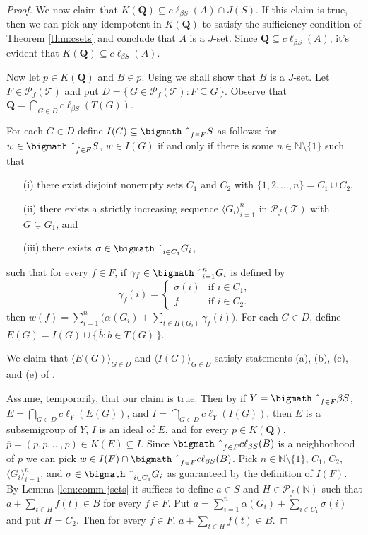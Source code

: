 \documentclass[12pt,showtrims]{memoir}
\theoremstyle{plain}
\theoremstyle{definition}
\newcommand{\la}{\langle}
\newcommand{\ra}{\rangle}
\newcommand{\bbN}{\mathbb{N}}
\newcommand{\calT}{\mathcal{T}}
\newcommand{\Pf}{\mathcal{P}_f}
\newcommand{\bigtimes}{\hbox{\bigmath \char'2}}
\begin{document}
\begin{proof}
  We now claim that $K(\mathbf{Q}) \subseteq c\ell_{\beta S}(A) \cap J(S)$. 
  If this claim is true, then we can pick any idempotent in $K(\mathbf{Q})$ to satisfy the sufficiency condition of Theorem \ref{thm:csets} and conclude that $A$ is a $J$-set.
  Since $\mathbf{Q} \subseteq c\ell_{\beta S}(A)$, it's evident that $K(\mathbf{Q}) \subseteq c\ell_{\beta S}(A)$. 

  Now let $p \in K(\mathbf{Q})$ and $B \in p$.
  Using \cite[Lemma 14.9]{Hindman:1998fk} we shall show that $B$ is a $J$-set.
  Let $F \in \Pf(\calT)$ and put $D = \{\, G \in \Pf(\calT) : F \subseteq G \,\}$. 
  Observe that $\mathbf{Q} = \bigcap_{G \in D} c\ell_{\beta S} (T(G))$.

  For each $G \in D$ define $I(G) \subseteq \bigtimes_{f \in F} S$ as follows: for $w \in \bigtimes_{f \in F} S$, $w \in I(G)$ if and only if there is some $n \in \bbN \setminus \{1\}$ such that
  \begin{itemize}
    \item[(i)]
      there exist disjoint nonempty sets $C_1$ and $C_2$ with $\{1, 2, \ldots, n\} = C_1 \cup C_2$,

    \item[(ii)]
      there exists a strictly increasing sequence $\la G_i \ra_{i=1}^n$ in $\Pf(\calT)$ with $G \subsetneq G_1$, and

    \item[(iii)]
      there exists $\sigma \in \bigtimes_{i \in C_1} G_i$,
  \end{itemize}
  such that for every $f \in F$, if $\gamma_f \in \bigtimes_{i=1}^n G_i$ is defined by
  \[
    \gamma_f(i) =
    \begin{cases}
      \sigma(i) & \mbox{if $i \in C_1$,} \\
      f & \mbox{if $i \in C_2$.}
    \end{cases}
  \]
  then $w(f) = \sum_{i=1}^n\bigl( \alpha(G_i) + \sum_{t \in H(G_i)} \gamma_f(i) \bigr)$.
  For each $G \in D$, define $E(G) = I(G) \cup \{\, \overline{b} : b \in T(G) \,\}$.

  We claim that $\la E(G) \ra_{G \in D}$ and $\la I(G) \ra_{G \in D}$ satisfy statements (a), (b), (c), and (e) of \cite[Lemma 14.9]{Hindman:1998fk}.

  Assume, temporarily, that our claim is true. 
  Then by \cite[Lemma 14.9]{Hindman:1998fk} if $Y = \bigtimes_{f \in F} \beta S$, $E = \bigcap_{G \in D} c\ell_Y(E(G))$, and $I = \bigcap_{G \in D} c\ell_Y(I(G))$, then $E$ is a subsemigroup of $Y$, $I$ is an ideal of $E$, and for every $p \in K(\mathbf{Q})$, $\overline{p} = (p, p, \ldots, p) \in K(E) \subseteq I$. 
  Since $\bigtimes_{f \in F} c\ell_{\beta S} (B)$ is a neighborhood of $\overline{p}$ we can pick $w \in I(F) \cap \bigtimes_{f \in F} c\ell_{\beta S} (B)$. 
  Pick $n \in \bbN\setminus \{1\}$, $C_1$, $C_2$, $\la G_i \ra_{i=1}^n$, and $\sigma \in \bigtimes_{i \in C_1} G_i$ as guaranteed by the definition of $I(F)$. 
  By Lemma \ref{lem:comm-jsets} it suffices to define $a \in S$ and $H \in \Pf(\bbN)$ such that $a + \sum_{t \in H} f(t) \in B$ for every $f \in F$. 
  Put $a = \sum_{i=1}^n \alpha(G_i) + \sum_{i \in C_1} \sigma(i)$ and put $H = C_2$.
  Then for every $f \in F$, $a + \sum_{t \in H} f(t) \in B$.


\end{proof}
\end{document}
